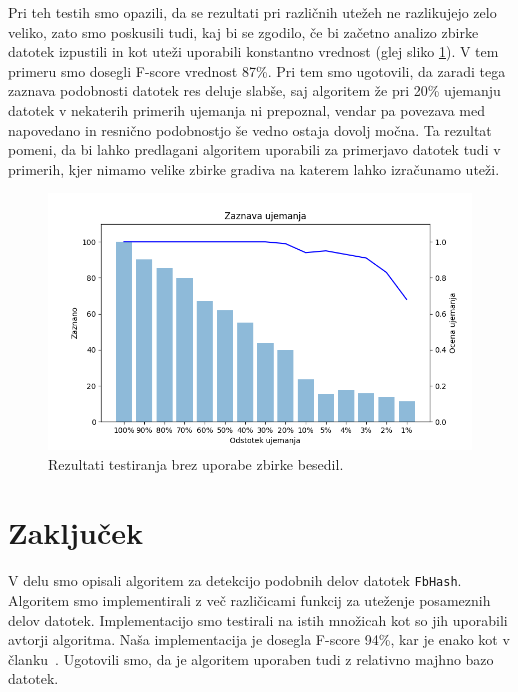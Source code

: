 \documentclass{acm_proc_article-sp}
\begin{document}
Pri teh testih smo opazili, da se rezultati pri različnih utežeh ne razlikujejo zelo veliko, zato smo poskusili tudi, kaj bi se zgodilo, če bi začetno analizo zbirke datotek izpustili in kot uteži uporabili konstantno vrednost (glej sliko \ref{fig:brezZbirke}). V tem primeru smo dosegli F-score vrednost 87\%. Pri tem smo ugotovili, da zaradi tega zaznava podobnosti datotek res deluje slabše, saj algoritem že pri 20\% ujemanju datotek v nekaterih primerih ujemanja ni prepoznal, vendar pa povezava med napovedano in resnično podobnostjo še vedno ostaja dovolj močna. Ta rezultat pomeni, da bi lahko predlagani algoritem uporabili za primerjavo datotek tudi v primerih, kjer nimamo velike zbirke gradiva na katerem lahko izračunamo uteži.

\begin{figure}[htb]
\begin{center}
\includegraphics[width=1\columnwidth]{brez_courpusa.png}
\end{center}
\caption{\small{Rezultati testiranja brez uporabe zbirke besedil.}}
\label{fig:brezZbirke}
\end{figure}

\FloatBarrier


\section{Zaklju\v{c}ek}
V delu smo opisali algoritem za detekcijo podobnih delov datotek \texttt{FbHash}. Algoritem smo implementirali z več različicami funkcij za uteženje posameznih delov datotek. Implementacijo smo testirali na istih množicah kot so jih uporabili avtorji algoritma. Naša implementacija je dosegla F-score 94\%, kar je enako kot v članku~\cite{fbhash}. Ugotovili smo, da je algoritem uporaben tudi z relativno majhno bazo datotek.
\end{document}

